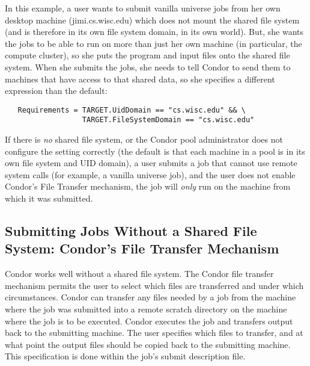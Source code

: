 In this example,
a user wants to submit vanilla universe jobs from her own desktop
machine (jimi.cs.wisc.edu) which does not mount the shared file system
(and is therefore in its own file system domain, in its own world).
But, she wants the jobs to be able to run on more than just her own
machine (in particular, the compute cluster), so she puts the program
and input files onto the shared file system.
When she submits the jobs, she needs to tell Condor to send them to
machines that have access to that shared data, so she specifies a
different  expression than the default:
\begin{verbatim}
   Requirements = TARGET.UidDomain == "cs.wisc.edu" && \
                  TARGET.FileSystemDomain == "cs.wisc.edu"
\end{verbatim}

\Warn If there is \emph{no} shared file system, or the Condor pool
administrator does not configure the \AdAttr{FileSystemDomain}
setting correctly (the default is that each machine in a pool is in
its own file system and UID domain), a user submits a job that cannot
use remote system calls (for example, a vanilla universe job), and the
user does not enable Condor's File Transfer mechanism, the job will
\emph{only} run on the machine from which it was submitted.


\subsection{\label{sec:file-transfer}
Submitting Jobs Without a Shared File System:
Condor's File Transfer Mechanism} 


Condor works well without a shared file system.
The Condor file transfer mechanism permits the user to select which files are
transferred and under which circumstances.
Condor can transfer any files needed by a job from
the machine where the job was submitted into a
remote scratch directory on the machine where the
job is to be executed.
Condor executes the job
and transfers output back to the submitting machine.
The user specifies which files to transfer,
and at what point the output files should be copied back to the
submitting machine.
This specification is done within the job's submit description file.

